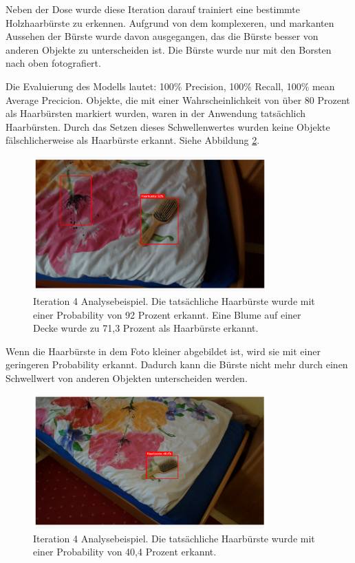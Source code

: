 Neben der Dose wurde diese Iteration darauf trainiert eine bestimmte Holzhaarbürste zu erkennen. Aufgrund von dem komplexeren, und markanten Aussehen der Bürste wurde davon ausgegangen, das die Bürste besser von anderen Objekte zu unterscheiden ist. 
Die Bürste wurde nur mit den Borsten nach oben fotografiert.

Die Evaluierung des Modells lautet: 100\% Precision, 100\% Recall, 100\% mean Average Precicion. Objekte, die mit einer Wahrscheinlichkeit von über 80 Prozent als Haarbürsten markiert wurden, waren in der Anwendung tatsächlich Haarbürsten. Durch das Setzen dieses Schwellenwertes wurden keine Objekte fälschlicherweise als Haarbürste erkannt. Siehe Abbildung \ref{img:it4}.

\begin{figure}[H]
	\centering
	\includegraphics[width=0.8\textwidth]{images/it4notpretty.png}
	\caption[Iteration 4 Analysebeispiel]{Iteration 4 Analysebeispiel. Die tatsächliche Haarbürste wurde mit einer Probability von 92 Prozent erkannt. Eine Blume auf einer Decke wurde zu 71,3 Prozent als Haarbürste erkannt.}
	\label{img:it4}
\end{figure}

Wenn die Haarbürste in dem Foto kleiner abgebildet ist, wird sie mit einer geringeren Probability erkannt. Dadurch kann die Bürste nicht mehr durch einen Schwellwert von anderen Objekten unterscheiden werden.

\begin{figure}[H]
	\centering
	\includegraphics[width=0.8\textwidth]{images/it4notpretty2.png}
	\caption[Iteration 4 zweites Analysebeispiel]{Iteration 4 Analysebeispiel. Die tatsächliche Haarbürste wurde mit einer Probability von 40,4 Prozent erkannt.}
	\label{img:it4}
\end{figure}
